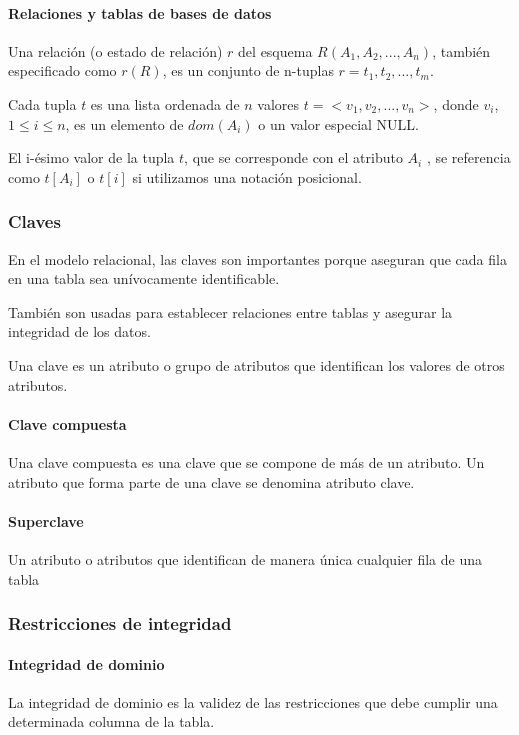 \paragraph*{Relaciones y tablas de bases de datos}   
Una relación (o estado de relación) $r$ del esquema $R(A_1, A_2,..., A_n)$, también especificado como $r(R)$, es un conjunto de n-tuplas $r={t_1, t_2,..., t_m}$.


Cada tupla $t$ es una lista ordenada de $n$ valores $t=<v_1, v_2,...,v_n>$, donde $v_i$, $1 \leq i \leq n$, es un elemento de $dom(A_i)$ o un valor especial NULL.


El i-ésimo valor de la tupla $t$, que se corresponde con el atributo $A_i$ , se referencia como $t[A_i]$ o $t[i]$ si utilizamos una notación posicional.

\subsubsection{Claves}

En el modelo relacional, las claves son importantes porque aseguran que cada fila en una tabla sea unívocamente identificable. 

También son usadas para establecer relaciones entre tablas y asegurar la integridad de los datos.

Una clave es un atributo o grupo de atributos que identifican los valores de otros atributos. 

\paragraph*{Clave compuesta}
Una clave compuesta es una clave que se compone de más de un atributo. Un atributo que forma parte de una clave se denomina atributo clave.

\paragraph*{Superclave}
Un atributo o atributos que identifican de manera única cualquier fila de una tabla

\subsubsection{Restricciones de integridad}
\paragraph*{Integridad de dominio}
La integridad de dominio es la validez de las restricciones que debe cumplir una determinada columna de la tabla.
